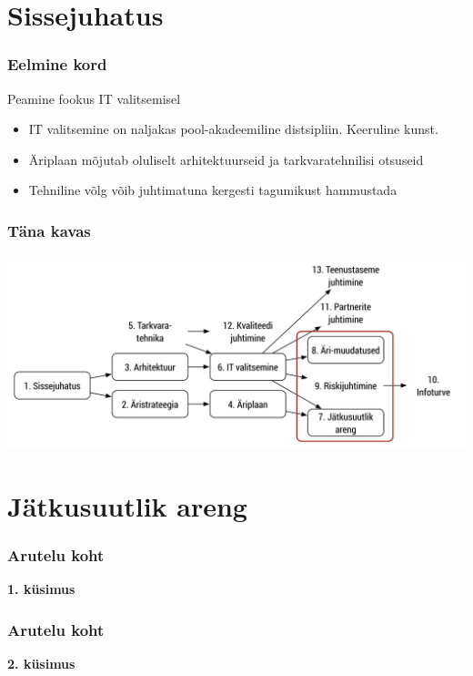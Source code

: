 

\maketitle

\section{Sissejuhatus}
\begin{frame}[fragile]
  \frametitle{Eelmine kord}
  Peamine fookus IT valitsemisel
	\begin{itemize}
		\item IT valitsemine on naljakas pool-akadeemiline distsipliin. Keeruline kunst.
		\item Äriplaan mõjutab oluliselt arhitektuurseid ja tarkvaratehnilisi otsuseid
		\item Tehniline võlg võib juhtimatuna kergesti tagumikust hammustada
	\end{itemize}
\end{frame}

\begin{frame}[fragile]
  \frametitle{Täna kavas}
		\includegraphics[width=\textwidth]{aine_struktuur_kolmas.pdf}
\end{frame}

\section{Jätkusuutlik areng}

\begin{frame}[fragile]
  \frametitle{Arutelu koht}
		\begin{center}
			\textbf{1. küsimus}
		\end{center}
\end{frame}

\begin{frame}[fragile]
  \frametitle{Arutelu koht}
		\begin{center}
			\textbf{2. küsimus}
		\end{center}
\end{frame}

